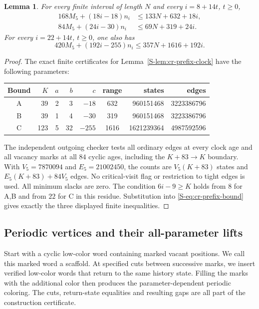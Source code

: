 \documentclass[11pt,reqno]{amsart}
\theoremstyle{plain}
\theoremstyle{plain}
\theoremstyle{plain}
\newtheorem{Slemma}[Stheorem]{Lemma}
\begin{document}
\begin{Slemma}\label{S-lem:cr-residue8-supports}
For every finite interval of length $N$ and every $i=8+14t$,
$t\ge0$,
\begin{align}
 168M_5+(18i-18)n_i&\le133N+632+18i,\label{S-eq:cr-prefix-A}\\
 84M_5+(24i-30)n_i&\le69N+319+24i.\label{S-eq:cr-prefix-B}
\end{align}
For every $i=22+14t$, $t\ge0$, one also has
\begin{equation}\label{S-eq:cr-prefix-C}
 420M_5+(192i-255)n_i\le357N+1616+192i.
\end{equation}
\end{Slemma}
\begin{proof}
The exact finite certificates for Lemma~\ref{S-lem:cr-prefix-clock}
have the following parameters:
\begin{center}\small
\begin{tabular}{@{}crrrrcrr@{}}\toprule
Bound&$K$&$a$&$b$&$c$&range&states&edges\\\midrule
A&39&2&3&$-18$&632&960151468&3223386796\\
B&39&1&4&$-30$&319&960151468&3223386796\\
C&123&5&32&$-255$&1616&1621239364&4987592596\\\bottomrule
\end{tabular}
\end{center}
The independent outgoing checker tests all ordinary edges at every
clock age and all vacancy marks at all $84$ cyclic ages, including
the $K+83\to K$ boundary. With $V_5=7870094$ and $E_5=21002450$,
the counts are $V_5(K+83)$ states and
$E_5(K+83)+84V_5$ edges. No critical-visit flag or restriction to
tight edges is used. All minimum slacks are zero. The condition
$6i-9\ge K$ holds from $8$ for A,B and from $22$ for C in this
residue. Substitution into \eqref{S-eq:cr-prefix-bound} gives exactly
the three displayed finite inequalities.
\end{proof}

\clearpage
\subsection{Periodic vertices and their all-parameter lifts}
\label{S-supp:cr-vertex-constructions}

Start with a cyclic low-color word containing marked vacant positions. We call
this marked word a scaffold. At specified cuts between successive marks, we
insert verified low-color words that return to the same history state. Filling
the marks with the additional color then produces the parameter-dependent
periodic coloring. The cuts, return-state equalities and resulting gaps are
all part of the construction certificate.
\end{document}
